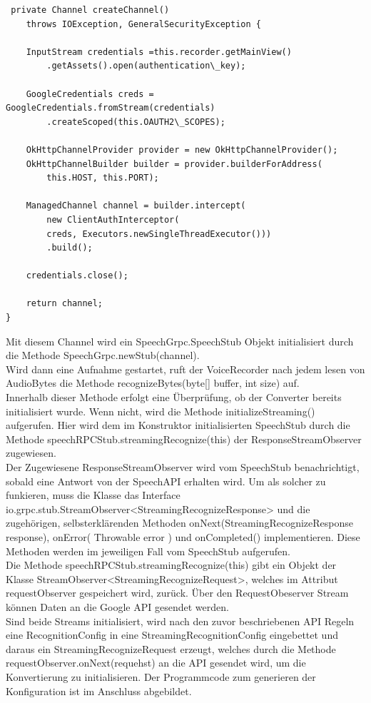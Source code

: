 \begin{lstlisting}
 private Channel createChannel()
 	throws IOException, GeneralSecurityException {
 	
	InputStream credentials =this.recorder.getMainView()
		.getAssets().open(authentication\_key);
		
	GoogleCredentials creds = GoogleCredentials.fromStream(credentials)
		.createScoped(this.OAUTH2\_SCOPES);
		
	OkHttpChannelProvider provider = new OkHttpChannelProvider();
	OkHttpChannelBuilder builder = provider.builderForAddress(
		this.HOST, this.PORT);
	
	ManagedChannel channel = builder.intercept(
		new ClientAuthInterceptor(
		creds, Executors.newSingleThreadExecutor()))
		.build();
	
	credentials.close();
	
	return channel;
}
\end{lstlisting}
Mit diesem Channel wird ein SpeechGrpc.SpeechStub Objekt initialisiert durch die Methode SpeechGrpc.newStub(channel).\\
Wird dann eine Aufnahme gestartet, ruft der VoiceRecorder nach jedem lesen von AudioBytes die Methode recognizeBytes(byte[] buffer, int size) auf.\\
Innerhalb dieser Methode erfolgt eine Überprüfung, ob der Converter bereits initialisiert wurde. Wenn nicht, wird die Methode initializeStreaming() aufgerufen. Hier wird dem im Konstruktor initialisierten SpeechStub durch die Methode speechRPCStub.streamingRecognize(this) der ResponseStreamObserver zugewiesen.\\
Der Zugewiesene ResponseStreamObserver wird vom SpeechStub benachrichtigt, sobald eine Antwort von der SpeechAPI erhalten wird. Um als solcher zu funkieren, muss die Klasse das Interface io.grpc.stub.StreamObserver<StreamingRecognizeResponse> und die zugehörigen, selbsterklärenden Methoden onNext(StreamingRecognizeResponse response), onError( Throwable error ) und onCompleted() implementieren. Diese Methoden werden im jeweiligen Fall vom SpeechStub aufgerufen.\\
Die Methode speechRPCStub.streamingRecognize(this) gibt ein Objekt der Klasse StreamObserver<StreamingRecognizeRequest>, welches im Attribut requestObserver gespeichert wird, zurück. Über den RequestObeserver Stream können Daten an die Google API gesendet werden.\\
Sind beide Streams initialisiert, wird nach den zuvor beschriebenen API Regeln eine RecognitionConfig in eine StreamingRecognitionConfig eingebettet und daraus ein StreamingRecognizeRequest erzeugt, welches durch die Methode requestObserver.onNext(requehst) an die API gesendet wird, um die Konvertierung zu initialisieren. Der Programmcode zum generieren der Konfiguration ist im Anschluss abgebildet.
